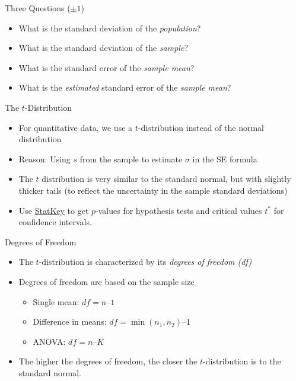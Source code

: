 \documentclass[
  ignorenonframetext,
  aspectratio=32,
]{beamer}
\providecommand{\tightlist}{%
  \setlength{\itemsep}{0pt}\setlength{\parskip}{0pt}}\usepackage{longtable,booktabs,array}
\begin{document}
\begin{frame}{Three Questions (\(\pm 1\))}
\protect\hypertarget{three-questions-pm-1}{}
\begin{itemize}
\item
  What is the standard deviation of the \emph{population}?
\item
  What is the standard deviation of the \emph{sample}?
\item
  What is the standard error of the \emph{sample mean}?
\item
  What is the \emph{estimated} standard error of the \emph{sample mean}?
\end{itemize}
\end{frame}

\begin{frame}{The \(t\)-Distribution}
\protect\hypertarget{the-t-distribution}{}
\begin{itemize}
\item
  For quantitative data, we use a \(t\)-distribution instead of the
  normal distribution
\item
  Reason: Using \(s\) from the sample to estimate \(\sigma\) in the SE
  formula
\item
  The \(t\) distribution is very similar to the standard normal, but
  with slightly thicker tails (to reflect the uncertainty in the sample
  standard deviations)
\item
  Use
  \href{https://www.lock5stat.com/StatKey/theoretical_distribution/theoretical_distribution.html\#t}{StatKey}
  to get \(p\)-values for hypothesis tests and critical values \(t^*\)
  for confidence intervals.
\end{itemize}
\end{frame}

\begin{frame}{Degrees of Freedom}
\protect\hypertarget{degrees-of-freedom}{}
\begin{itemize}
\tightlist
\item
  The \(t\)-distribution is characterized by its \emph{degrees of
  freedom (df)}\\
\item
  Degrees of freedom are based on the sample size

  \begin{itemize}
  \tightlist
  \item
    Single mean: \(df = n – 1\)\\
  \item
    Difference in means: \(df = \min(n_1, n_2) – 1\)
  \item
    ANOVA: \(df = n – K\)
  \end{itemize}
\item
  The higher the degrees of freedom, the closer the \(t\)-distribution
  is to the standard normal.
\end{itemize}
\end{frame}
\end{document}
